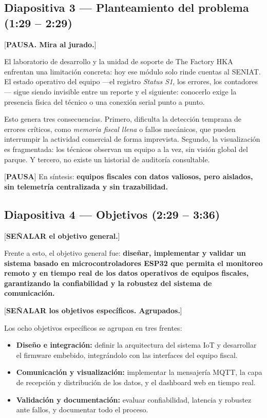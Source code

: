 \documentclass[11pt, a4paper]{article}
\begin{document}
\subsection*{Diapositiva 3 — Planteamiento del problema (1:29 – 2:29)}

[\textbf{PAUSA. Mira al jurado.}]

El laboratorio de desarrollo y la unidad de soporte de The Factory HKA enfrentan una limitación concreta: hoy ese módulo solo rinde cuentas al SENIAT. El estado operativo del equipo —el registro \textit{Status S1}, los errores, los contadores— sigue siendo invisible entre un reporte y el siguiente: conocerlo exige la presencia física del técnico o una conexión serial punto a punto.

Esto genera tres consecuencias. Primero, dificulta la detección temprana de errores críticos, como \textit{memoria fiscal llena} o fallos mecánicos, que pueden interrumpir la actividad comercial de forma imprevista. Segundo, la visualización es fragmentada: los técnicos observan un equipo a la vez, sin visión global del parque. Y tercero, no existe un historial de auditoría consultable.

[\textbf{PAUSA}] En síntesis: \textbf{equipos fiscales con datos valiosos, pero aislados, sin telemetría centralizada y sin trazabilidad.}

\subsection*{Diapositiva 4 — Objetivos (2:29 – 3:36)}

[\textbf{SEÑALAR el objetivo general.}]

Frente a esto, el objetivo general fue: \textbf{diseñar, implementar y validar un sistema basado en microcontroladores ESP32 que permita el monitoreo remoto y en tiempo real de los datos operativos de equipos fiscales, garantizando la confiabilidad y la robustez del sistema de comunicación.}

[\textbf{SEÑALAR los objetivos específicos. Agrupados.}]

Los ocho objetivos específicos se agrupan en tres frentes:

\begin{itemize}[label=-]
    \item \textbf{Diseño e integración:} definir la arquitectura del sistema IoT y desarrollar el firmware embebido, integrándolo con las interfaces del equipo fiscal.
    \item \textbf{Comunicación y visualización:} implementar la mensajería MQTT, la capa de recepción y distribución de los datos, y el dashboard web en tiempo real.
    \item \textbf{Validación y documentación:} evaluar confiabilidad, latencia y robustez ante fallos, y documentar todo el proceso.
\end{itemize}
\end{document}
